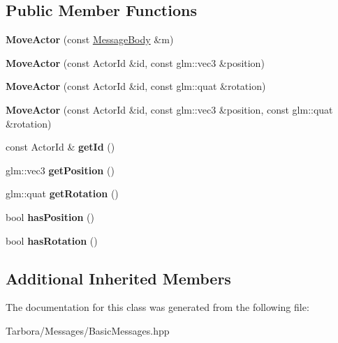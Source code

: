 \subsection*{Public Member Functions}
\begin{DoxyCompactItemize}
\item 
\mbox{\label{classTarbora_1_1Message_1_1MoveActor_a14e8f8d723286934389855c82ae6ee7a}} 
{\bfseries Move\+Actor} (const \hyperlink{classTarbora_1_1MessageBody}{Message\+Body} \&m)
\item 
\mbox{\label{classTarbora_1_1Message_1_1MoveActor_a338a61b352652f1f0c85ae4118056906}} 
{\bfseries Move\+Actor} (const Actor\+Id \&id, const glm\+::vec3 \&position)
\item 
\mbox{\label{classTarbora_1_1Message_1_1MoveActor_a13192ca87c10346a03a2792a6b378bc4}} 
{\bfseries Move\+Actor} (const Actor\+Id \&id, const glm\+::quat \&rotation)
\item 
\mbox{\label{classTarbora_1_1Message_1_1MoveActor_a52edb9bb6caf0d16300ef57c215a870e}} 
{\bfseries Move\+Actor} (const Actor\+Id \&id, const glm\+::vec3 \&position, const glm\+::quat \&rotation)
\item 
\mbox{\label{classTarbora_1_1Message_1_1MoveActor_ad34ea8474eeb3266681f80702a103adb}} 
const Actor\+Id \& {\bfseries get\+Id} ()
\item 
\mbox{\label{classTarbora_1_1Message_1_1MoveActor_aa9ffc8bd09c0fcfc0252182b10e33fef}} 
glm\+::vec3 {\bfseries get\+Position} ()
\item 
\mbox{\label{classTarbora_1_1Message_1_1MoveActor_af15c1a65bacd113e7e35fcd310af5ad3}} 
glm\+::quat {\bfseries get\+Rotation} ()
\item 
\mbox{\label{classTarbora_1_1Message_1_1MoveActor_a45cdd013afbae99a1ed655207dfd6fe5}} 
bool {\bfseries has\+Position} ()
\item 
\mbox{\label{classTarbora_1_1Message_1_1MoveActor_a5692b23e0b980c0df6791700b0b02a58}} 
bool {\bfseries has\+Rotation} ()
\end{DoxyCompactItemize}
\subsection*{Additional Inherited Members}


The documentation for this class was generated from the following file\+:\begin{DoxyCompactItemize}
\item 
Tarbora/\+Messages/Basic\+Messages.\+hpp\end{DoxyCompactItemize}

